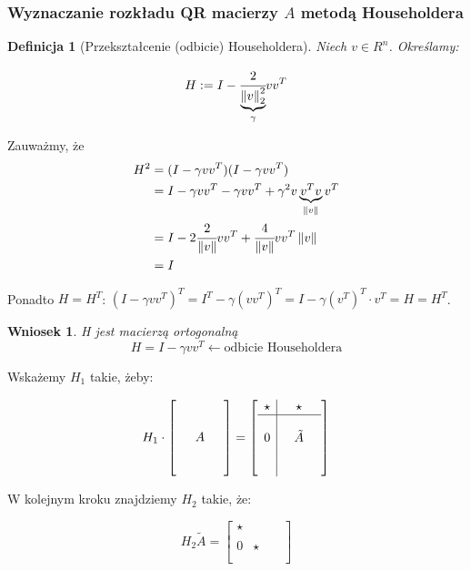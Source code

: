 \documentclass[hidelinks,a4paper]{article}
\newcommand{\la}{\leftarrow}
\newcommand{\norm}[1]{\left\lVert#1\right\rVert}
\newtheorem{wniosek}{Wniosek}
\newtheorem{defi}{Definicja}
\begin{document}
\subsubsection{Wyznaczanie rozkładu QR macierzy $A$ metodą Householdera}


\begin{defi}[Przekształcenie (odbicie) Householdera] 
Niech $v \in R^n$. Określamy:
	
	\[
		H := I - \cfrac{2}{\underbrace{\norm{v}_2^2}_{\gamma}}vv^T
	\]
\end{defi}

Zauważmy, że 
\begin{align*}
H^2 & = (I - \gamma vv^T)(I - \gamma vv^T) \\
& = I - \gamma vv^T - \gamma vv^T + \gamma^2v\underbrace{v^Tv}_{\norm{v}}v^T \\
& = I - 2 \cfrac{2}{\norm{v}}v v^T + \cfrac{4}{\norm{v}}  vv^T \norm{v} \\
& = I
\end{align*}

Ponadto $H = H^T$: $(I - \gamma vv^T)^T = I^T - \gamma(vv^T)^T = I - \gamma(v^T)^T \cdot v^T = H = H^T$.

\begin{wniosek}H jest macierzą ortogonalną
	\[
		H = I - \gamma vv^T \la \textrm{odbicie Householdera}
	\]
\end{wniosek}

Wskażemy $H_1$ takie, żeby:

\[
H_1 \cdot \left[ \begin{array}{c}\\ \\ \quad A \quad \\ \\ \ \end{array} \right] = 
\left[ \begin{array}{c|c}\star & \quad \star \quad \\ \hline \\ 0 & \tilde{A}\\ & \\ & \end{array}\right]
\]

W kolejnym kroku znajdziemy $H_2$ takie, że:

\[
H_2 \tilde{A} = \left[ \begin{array}{c|c}\star & \quad  \quad \\  \\ 0 & \star \\ & \\ & \end{array}\right]
\]
\end{document}
